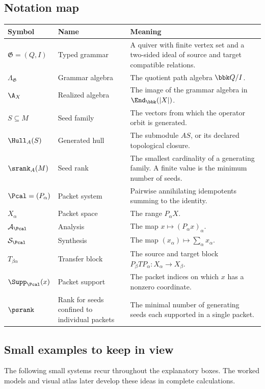 \subsection*{Notation map}
\begingroup\small
\begin{center}
\begin{longtable}{@{}p{}p{}p{}@{}}
\toprule
\textbf{Symbol} & \textbf{Name} & \textbf{Meaning}\\
\midrule
\endhead
\(\mathfrak G=(Q,I)\) & Typed grammar & A quiver with finite vertex set and a two-sided ideal of source and target compatible relations.\\
\(\Lambda_{\mathfrak G}\) & Grammar algebra & The quotient path algebra \(\bbk Q/I\).\\
\(\A_X\) & Realized algebra & The image of the grammar algebra in \(\End_{\bbk}(|X|)\).\\
\(S\subseteq M\) & Seed family & The vectors from which the operator orbit is generated.\\
\(\Hull_A(S)\) & Generated hull & The submodule \(AS\), or its declared topological closure.\\
\(\srank_A(M)\) & Seed rank & The smallest cardinality of a generating family. A finite value is the minimum number of seeds.\\
\(\Pcal=(P_\alpha)\) & Packet system & Pairwise annihilating idempotents summing to the identity.\\
\(X_\alpha\) & Packet space & The range \(P_\alpha X\).\\
\(\mathcal A_{\Pcal}\) & Analysis & The map \(x\mapsto(P_\alpha x)_\alpha\).\\
\(\mathcal S_{\Pcal}\) & Synthesis & The map \((x_\alpha)\mapsto\sum_\alpha x_\alpha\).\\
\(T_{\beta\alpha}\) & Transfer block & The source and target block \(P_\beta TP_\alpha:X_\alpha\to X_\beta\).\\
\(\Supp_{\Pcal}(x)\) & Packet support & The packet indices on which \(x\) has a nonzero coordinate.\\
\(\psrank\) & Rank for seeds confined to individual packets & The minimal number of generating seeds each supported in a single packet.\\
\bottomrule
\end{longtable}
\end{center}
\endgroup

\subsection*{Small examples to keep in view}
The following small systems recur throughout the explanatory boxes. The worked models and visual atlas later develop these ideas in complete calculations.

